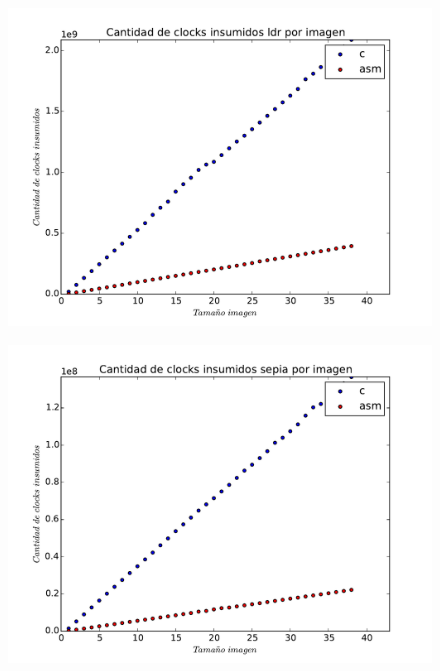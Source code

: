 \begin{figure}
  \begin{center}
	\includegraphics[scale=0.5]{ldrallfijo.pdf}
  \end{center}
\end{figure}

\begin{figure}
  \begin{center}
	\includegraphics[scale=0.5]{sepiaallfijo.pdf}
  \end{center}
\end{figure}


